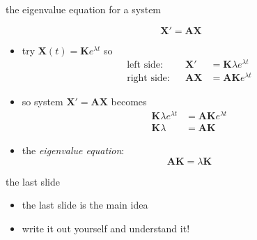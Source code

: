 \documentclass[urlcolor=blue,dvipsnames]{beamer}
\newcommand{\bA}{\mathbf{A}}
\newcommand{\bK}{\mathbf{K}}
\newcommand{\bX}{\mathbf{X}}
\begin{document}
\begin{frame}{the eigenvalue equation for a system}

    $$\bX' = \bA \bX$$

\bigskip
\begin{itemize}
\item try \quad $\bX(t) = \bK e^{\lambda t}$ \quad so
    \begin{align*}
         \text{left side:}&  & \bX' &= \bK \lambda e^{\lambda t} \\
        \text{right side:}&  & \bA\bX &= \bA \bK e^{\lambda t}
    \end{align*}
\item so system $\bX' = \bA \bX$ becomes
\begin{align*}
    \bK \lambda e^{\lambda t} &= \bA \bK e^{\lambda t} \\
    \bK \lambda &= \bA \bK
\end{align*}
\item the \emph{eigenvalue equation}:
    $$\boxed{\bA \bK = \lambda \bK}$$
\end{itemize}
\end{frame}


\begin{frame}{the last slide}

\begin{itemize}
\item \alert{the last slide is the main idea}
\item write it out yourself and understand it!
\end{itemize}
\end{frame}
\end{document}
